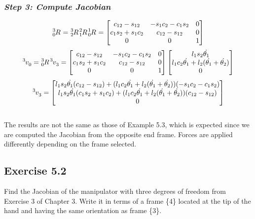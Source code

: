 \documentclass[10pt]{article}
\begin{document}
\subsubsection*{\textit{\textbf{Step 3: Compute Jacobian}}}
\[
\tensor*[^{3}_{0}]{R}{} =
\tensor*[^{3}_{2}]{R}{}
\tensor*[^{2}_{1}]{R}{}
\tensor*[^{1}_{0}]{R}{} =
\begin{bmatrix}
    c_{12} - s_{12}  		& -s_{1}c_{2} - c_{1}s_{2}  & 0     \\
    c_{1}s_{2} + s_{1}c_{2} & c_{12} - s_{12}       	& 0     \\
    0            			& 0        					& 1     
\end{bmatrix}
\]
\[
\tensor*[^{3}]{v}{_0} =
\tensor*[^{3}_{0}]{R}{}\tensor*[^{3}]{v}{_3}=
\begin{bmatrix}
    c_{12} - s_{12}  		& -s_{1}c_{2} - c_{1}s_{2}  & 0     \\
    c_{1}s_{2} + s_{1}c_{2} & c_{12} - s_{12}       	& 0     \\
    0            			& 0        					& 1     
\end{bmatrix}
\begin{bmatrix}
    l_{1}s_{2}\dot{\theta_{1}}    		  \\
    l_{1}c_{2}\dot{\theta_{1}} + l_{2}(\dot{\theta_{1}} + \dot{\theta_{2}})    \\
    0   
\end{bmatrix}
\]
\[
\tensor*[^{3}]{v}{_3} =
\begin{bmatrix}
    l_{1}s_{2}\dot{\theta_{1}}(c_{12} - s_{12}) + (l_{1}c_{2}\dot{\theta_{1}} + l_{2}(\dot{\theta_{1}} + \dot{\theta_{2}}))(-s_{1}c_{2} - c_{1}s_{2})  		  \\
    l_{1}s_{2}\dot{\theta_{1}}(c_{1}s_{2} + s_{1}c_{2}) + (l_{1}c_{2}\dot{\theta_{1}} + l_{2}(\dot{\theta_{1}} + \dot{\theta_{2}}))(c_{12} - s_{12})    \\
    0   
\end{bmatrix}
\]\\
The results are not the same as those of Example 5.3, which is expected since we are computed the Jacobian from the opposite end frame.  Forces are applied differently depending on the frame selected.
\subsection*{Exercise 5.2}
Find the Jacobian of the manipulator with three degrees of freedom from Exercise 3 of Chapter 3. Write it in terms of a frame \{4\} located at the tip of the hand and having the same orientation as frame \{3\}.
\end{document}
